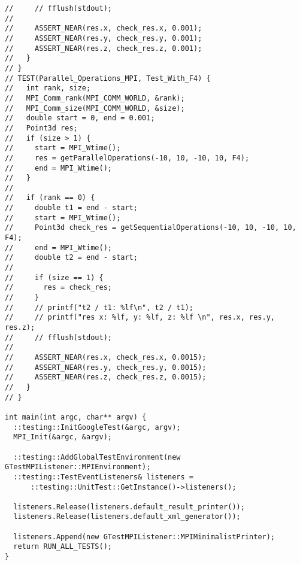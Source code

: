 \documentclass{report}
\begin{document}
\begin{lstlisting}
//     // fflush(stdout);
//
//     ASSERT_NEAR(res.x, check_res.x, 0.001);
//     ASSERT_NEAR(res.y, check_res.y, 0.001);
//     ASSERT_NEAR(res.z, check_res.z, 0.001);
//   }
// }
// TEST(Parallel_Operations_MPI, Test_With_F4) {
//   int rank, size;
//   MPI_Comm_rank(MPI_COMM_WORLD, &rank);
//   MPI_Comm_size(MPI_COMM_WORLD, &size);
//   double start = 0, end = 0.001;
//   Point3d res;
//   if (size > 1) {
//     start = MPI_Wtime();
//     res = getParallelOperations(-10, 10, -10, 10, F4);
//     end = MPI_Wtime();
//   }
//
//   if (rank == 0) {
//     double t1 = end - start;
//     start = MPI_Wtime();
//     Point3d check_res = getSequentialOperations(-10, 10, -10, 10, F4);
//     end = MPI_Wtime();
//     double t2 = end - start;
//
//     if (size == 1) {
//       res = check_res;
//     }
//     // printf("t2 / t1: %lf\n", t2 / t1);
//     // printf("res x: %lf, y: %lf, z: %lf \n", res.x, res.y, res.z);
//     // fflush(stdout);
//
//     ASSERT_NEAR(res.x, check_res.x, 0.0015);
//     ASSERT_NEAR(res.y, check_res.y, 0.0015);
//     ASSERT_NEAR(res.z, check_res.z, 0.0015);
//   }
// }

int main(int argc, char** argv) {
  ::testing::InitGoogleTest(&argc, argv);
  MPI_Init(&argc, &argv);

  ::testing::AddGlobalTestEnvironment(new GTestMPIListener::MPIEnvironment);
  ::testing::TestEventListeners& listeners =
      ::testing::UnitTest::GetInstance()->listeners();

  listeners.Release(listeners.default_result_printer());
  listeners.Release(listeners.default_xml_generator());

  listeners.Append(new GTestMPIListener::MPIMinimalistPrinter);
  return RUN_ALL_TESTS();
}
\end{lstlisting}
\end{document}
